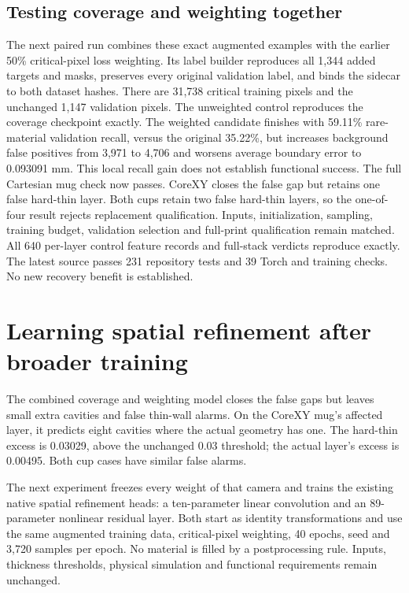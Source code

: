\documentclass[10pt,letterpaper]{article}
\begin{document}
\subsection*{Testing coverage and weighting together}
The next paired run combines these exact augmented examples with the earlier
50\% critical-pixel loss weighting. Its label builder reproduces all 1,344 added
targets and masks, preserves every original validation label, and binds the
sidecar to both dataset hashes. There are 31,738 critical training pixels and
the unchanged 1,147 validation pixels. The unweighted control reproduces the
coverage checkpoint exactly. The weighted candidate finishes with 59.11\%
rare-material validation recall, versus the original 35.22\%, but increases
background false positives from 3,971 to 4,706 and worsens average boundary error
to 0.093091 mm. This local recall gain does not establish functional success.
The full Cartesian mug check now passes. CoreXY closes the false gap but retains
one false hard-thin layer. Both cups retain two false hard-thin layers, so the
one-of-four result rejects replacement qualification. Inputs,
initialization, sampling, training budget, validation selection and full-print
qualification remain matched. All 640 per-layer control feature
records and full-stack verdicts reproduce exactly. The latest source passes 231 repository
tests and 39 Torch and training checks. No new recovery benefit is established.

\clearpage
\section{Learning spatial refinement after broader training}
The combined coverage and weighting model closes the false gaps but leaves
small extra cavities and false thin-wall alarms. On the CoreXY mug's affected
layer, it predicts eight cavities where the actual geometry has one. The
hard-thin excess is 0.03029, above the unchanged 0.03 threshold; the actual
layer's excess is 0.00495. Both cup cases have similar false alarms.

The next experiment freezes every weight of that camera and trains the existing
native spatial refinement heads: a ten-parameter linear convolution and an
89-parameter nonlinear residual layer. Both start as identity transformations
and use the same augmented training data, critical-pixel weighting, 40 epochs,
seed and 3,720 samples per epoch. No material is filled by a postprocessing rule.
Inputs, thickness thresholds, physical simulation and functional requirements
remain unchanged.
\end{document}
